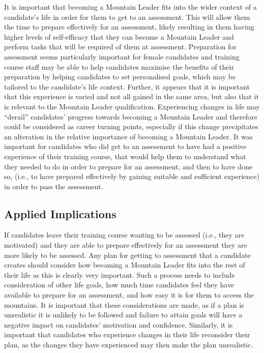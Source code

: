\documentclass[
  12pt,
  a4paper,
]{book}
\begin{document}
It is important that becoming a Mountain Leader fits into the wider context of a candidate's life in order for them to get to an assessment. This will allow them the time to prepare effectively for an assessment, likely resulting in them having higher levels of self-efficacy that they can become a Mountain Leader and perform tasks that will be required of them at assessment. Preparation for assessment seems particularly important for female candidates and training course staff may be able to help candidates maximise the benefits of their preparation by helping candidates to set personalised goals, which may be tailored to the candidate's life context. Further, it appears that it is important that this experience is varied and not all gained in the same area, but also that it is relevant to the Mountain Leader qualification. Experiencing changes in life may ``derail'' candidates' progress towards becoming a Mountain Leader and therefore could be considered as career turning points, especially if this change precipitates an alteration in the relative importance of becoming a Mountain Leader. It was important for candidates who did get to an assessment to have had a positive experience of their training course, that would help them to understand what they needed to do in order to prepare for an assessment, and then to have done so, (i.e., to have prepared effectively by gaining suitable and sufficient experience) in order to pass the assessment.

\hypertarget{ml-pra-applied-implications}{%
\subsection{Applied Implications}\label{ml-pra-applied-implications}}

If candidates leave their training course wanting to be assessed (i.e., they are motivated) and they are able to prepare effectively for an assessment they are more likely to be assessed. Any plan for getting to assessment that a candidate creates should consider how becoming a Mountain Leader fits into the rest of their life as this is clearly very important. Such a process needs to include consideration of other life goals, how much time candidates feel they have available to prepare for an assessment, and how easy it is for them to access the mountains. It is important that these considerations are made, as if a plan is unrealistic it is unlikely to be followed and failure to attain goals will have a negative impact on candidates' motivation and confidence. Similarly, it is important that candidates who experience changes in their life reconsider their plan, as the changes they have experienced may then make the plan unrealistic.
\end{document}
